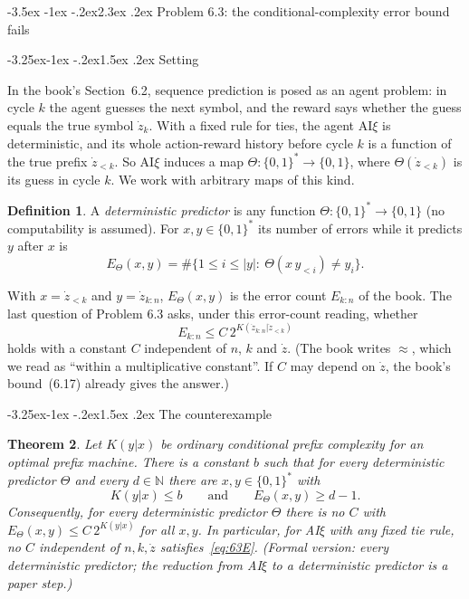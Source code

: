 \documentclass[11pt]{article}
\makeatletter
\renewcommand\section{\@startsection{section}{1}{\z@}%
  {-3.5ex \@plus -1ex \@minus -.2ex}{2.3ex \@plus.2ex}%
  {\normalfont\Large\bfseries\boldmath}}
\renewcommand\subsection{\@startsection{subsection}{2}{\z@}%
  {-3.25ex\@plus -1ex \@minus -.2ex}{1.5ex \@plus .2ex}%
  {\normalfont\large\bfseries\boldmath}}
\newcommand{\B}{\{0,1\}}
\newcommand{\Bs}{\{0,1\}^*}
\newcommand{\N}{\mathbb{N}}
\newcommand{\AIxi}{\textup{AI}\ensuremath{\xi}}
\newtheorem{theorem}{Theorem}[section]
\theoremstyle{definition}
\newtheorem{definition}[theorem]{Definition}
\theoremstyle{remark}
\makeatother
\begin{document}
\section{Problem 6.3: the conditional-complexity error bound fails}\label{sec:63}

\subsection{Setting}

In the book's Section~6.2, sequence prediction is posed as an agent problem:
in cycle $k$ the agent guesses the next symbol, and the reward says whether the
guess equals the true symbol $\dot z_k$. With a fixed rule for
ties, the agent \AIxi{} is deterministic, and its whole action-reward history
before cycle $k$ is a function of the true prefix $\dot z_{<k}$. So \AIxi{}
induces a map $\Theta:\Bs\to\B$, where $\Theta(\dot z_{<k})$ is its guess in cycle $k$.
We work with arbitrary maps of this kind.

\begin{definition}
A \emph{deterministic predictor} is any function $\Theta:\Bs\to\B$ (no
computability is assumed). For $x,y\in\Bs$ its number of errors while it
predicts $y$ after $x$ is
\[
E_\Theta(x,y)=\#\{1\le i\le|y|:\ \Theta(x\,y_{<i})\neq y_i\}.
\]
\end{definition}

With $x=\dot z_{<k}$ and $y=\dot z_{k:n}$, $E_\Theta(x,y)$ is the error count
$E_{k:n}$ of the book. The last question of Problem 6.3 asks, under this
error-count reading, whether
\begin{equation}\label{eq:63E}
E_{k:n}\le C\,2^{K(\dot z_{k:n}|\dot z_{<k})}
\end{equation}
holds with a constant $C$ independent of $n$, $k$ and $\dot z$. (The book
writes $\approx$, which we read as ``within a multiplicative constant''. If $C$
may depend on $\dot z$, the book's bound~(6.17) already gives the answer.)

\subsection{The counterexample}

\begin{theorem}\label{thm:63E}
Let $K(y|x)$ be ordinary conditional prefix complexity for an optimal prefix
machine. There is a constant $b$ such that for every deterministic predictor
$\Theta$ and every $d\in\N$ there are $x,y\in\Bs$ with
\[
K(y|x)\le b\qquad\text{and}\qquad E_\Theta(x,y)\ge d-1 .
\]
Consequently, for every deterministic predictor $\Theta$ there is no $C$ with
$E_\Theta(x,y)\le C\,2^{K(y|x)}$ for all $x,y$. In particular, for \AIxi{} with any
fixed tie rule, no $C$ independent of $n,k,\dot z$ satisfies~\eqref{eq:63E}.
(Formal version: every deterministic predictor; the reduction from \AIxi{} to
a deterministic predictor is a paper step.)
\end{theorem}
\end{document}
